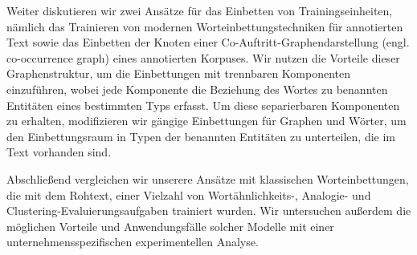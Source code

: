 Weiter diskutieren wir zwei Ansätze für das Einbetten von Trainingseinheiten, nämlich das Trainieren von modernen Worteinbettungstechniken für annotierten Text sowie das Einbetten der Knoten einer Co-Auftritt-Graphendarstellung (engl. co-occurrence graph) eines annotierten Korpuses. Wir nutzen die Vorteile dieser Graphenstruktur, um die Einbettungen mit trennbaren Komponenten einzuführen, wobei jede Komponente die Beziehung des Wortes zu benannten Entitäten eines bestimmten Typs erfasst. Um diese separierbaren Komponenten zu erhalten, modifizieren wir gängige Einbettungen für Graphen und Wörter, um den Einbettungsraum in Typen der benannten Entitäten zu unterteilen, die im Text vorhanden sind.

Abschließend vergleichen wir unserere Ansätze mit klassischen Worteinbettungen, die mit dem Rohtext, einer Vielzahl von Wortähnlichkeits-, Analogie- und Clustering-Evaluierungsaufgaben trainiert wurden. Wir untersuchen außerdem die möglichen Vorteile und Anwendungsfälle solcher Modelle mit einer unternehmensspezifischen experimentellen Analyse.